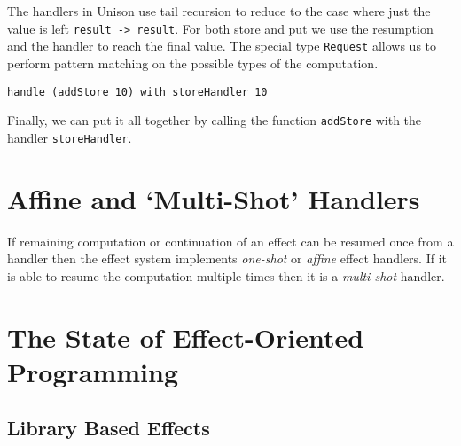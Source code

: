 \documentclass[logo,bsc,singlespacing,parskip]{infthesis}
\begin{document}
The handlers in Unison use tail recursion to reduce to the case where just the
value is left \texttt{result -> result}. For both store and put we use the
resumption and the handler to reach the final value. The special type
\texttt{Request} allows us to perform pattern matching on the possible types of
the computation.

\begin{lstlisting}
handle (addStore 10) with storeHandler 10
\end{lstlisting}

Finally, we can put it all together by calling the function \texttt{addStore}
with the handler \texttt{storeHandler}. 

\section{Affine and `Multi-Shot' Handlers}

If remaining computation or continuation of an effect can be resumed once from
a handler then the effect system implements \emph{one-shot} or \emph{affine}
effect handlers. If it is able to resume the computation multiple times then it
is a \emph{multi-shot} handler. 

\section{The State of Effect-Oriented Programming}

\subsection{Library Based Effects}
\end{document}
